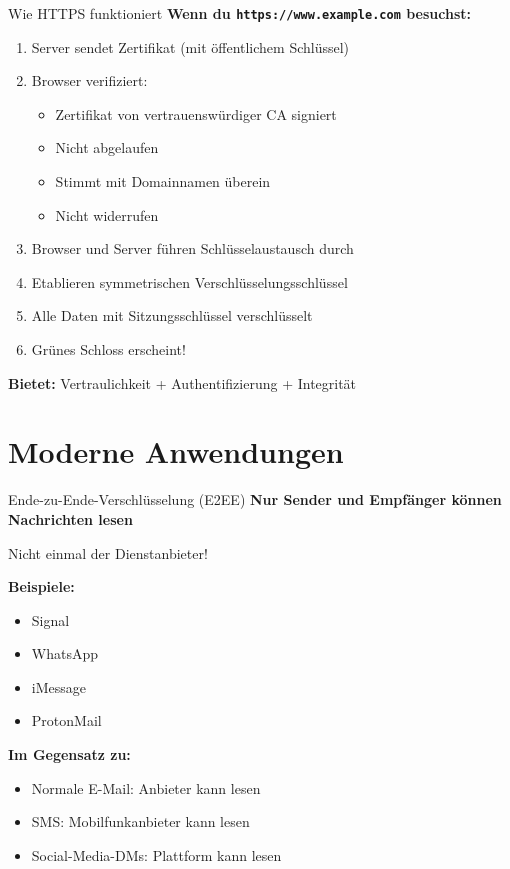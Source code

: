 \documentclass[handout]{beamer}
\begin{document}
\begin{frame}{Wie HTTPS funktioniert}
\textbf{Wenn du \texttt{https://www.example.com} besuchst:}

\begin{enumerate}
    \item Server sendet Zertifikat (mit öffentlichem Schlüssel)
    \item Browser verifiziert:
    \begin{itemize}
        \item Zertifikat von vertrauenswürdiger CA signiert
        \item Nicht abgelaufen
        \item Stimmt mit Domainnamen überein
        \item Nicht widerrufen
    \end{itemize}
    \item Browser und Server führen Schlüsselaustausch durch
    \item Etablieren symmetrischen Verschlüsselungsschlüssel
    \item Alle Daten mit Sitzungsschlüssel verschlüsselt
    \item Grünes Schloss erscheint!
\end{enumerate}

\vspace{0.3cm}
\textbf{Bietet:} Vertraulichkeit + Authentifizierung + Integrität

\end{frame}

\section{Moderne Anwendungen}

\begin{frame}{Ende-zu-Ende-Verschlüsselung (E2EE)}
\textbf{Nur Sender und Empfänger können Nachrichten lesen}

Nicht einmal der Dienstanbieter!

\vspace{0.3cm}
\textbf{Beispiele:}
\begin{itemize}
    \item Signal
    \item WhatsApp
    \item iMessage
    \item ProtonMail
\end{itemize}

\vspace{0.3cm}
\textbf{Im Gegensatz zu:}
\begin{itemize}
    \item Normale E-Mail: Anbieter kann lesen
    \item SMS: Mobilfunkanbieter kann lesen
    \item Social-Media-DMs: Plattform kann lesen
\end{itemize}

\end{frame}
\end{document}

